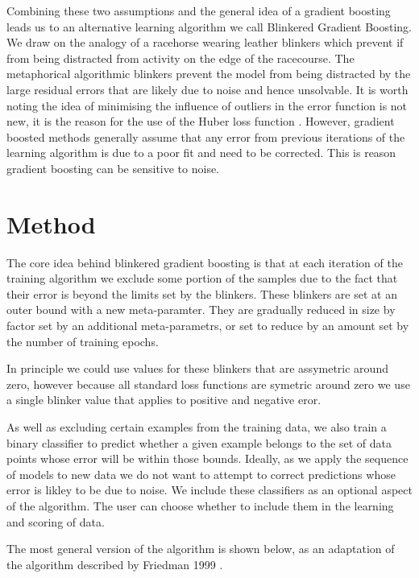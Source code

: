 \documentclass[11pt,twoside,a4paper]{article}
\begin{document}
Combining these two assumptions and the general idea of a gradient boosting leads us to
an alternative learning algorithm we call Blinkered Gradient Boosting. 
We draw on the analogy of a racehorse wearing 
leather blinkers which prevent if from being distracted from activity on the edge
of the racecourse. The metaphorical algorithmic blinkers prevent the model from being
distracted by the large residual errors that are likely due to noise and hence unsolvable.
It is worth noting the idea of minimising the influence of outliers in the error function is 
not new, it is the reason for the use of the Huber loss function \cite{}. However, gradient boosted
methods generally assume that any error from previous iterations of the learning algorithm is
due to a poor fit and need to be corrected. This is reason gradient boosting can be sensitive to
noise.
 

\section{Method}

The core idea behind blinkered gradient boosting is that at each iteration of the training
algorithm we exclude some portion of the samples due to the fact that their error is beyond
the limits set by the blinkers. These blinkers are set at an outer bound with a new meta-paramter.
They are gradually reduced in size by factor set by an additional meta-parametrs, or set to 
reduce by an amount set by the number of training epochs.

In principle we could use values for these blinkers that are assymetric around zero, however because
all standard loss functions are symetric around zero we use a single blinker value that applies to positive
and negative eror.

As well as excluding certain examples from the training data, we also train a binary classifier
to predict whether a given example belongs to the set of data points whose error will be within those
bounds. Ideally, as we apply the sequence of models to new data we do not want to attempt to correct
predictions whose error is likley to be due to noise. We include these classifiers as an optional
aspect of the algorithm. The user can choose whether to include them in the learning and scoring
of data.

The most general version of the algorithm is shown below, as an adaptation of the algorithm described by
Friedman 1999 \cite{Friedman1999}.
\end{document}
